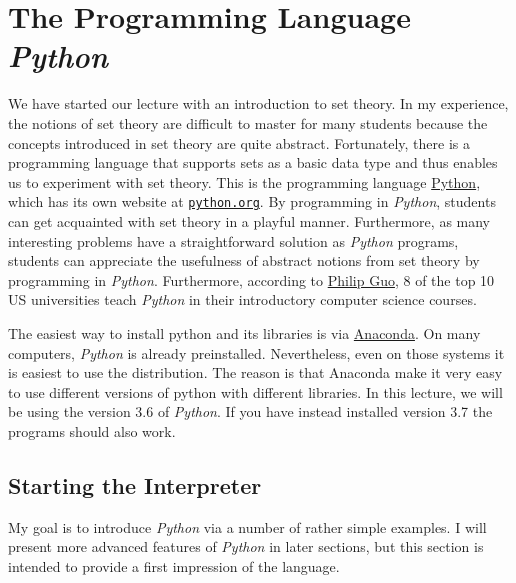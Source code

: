 \chapter{The Programming Language \textsl{Python}}
We have started our lecture with an introduction to set theory.  In my experience, the notions of
set theory are difficult to master for many students because the concepts introduced in set theory
are quite abstract.  Fortunately, there is a programming language that supports sets as a basic data type and
thus enables us to experiment with set theory.  This is the programming language
\href{https://en.wikipedia.org/wiki/Python_(programming_language)}{Python}, which has its own website at
\href{http://www.python.org}{\texttt{python.org}}. 
By programming in \textsl{Python}, students can get acquainted with set theory in a playful manner.
Furthermore, as many interesting problems have a straightforward solution as \textsl{Python} programs,
students can appreciate the usefulness of abstract notions from set theory by programming in \textsl{Python}.
Furthermore, according to 
\href{https://cacm.acm.org/blogs/blog-cacm/176450-python-is-now-the-most-popular-introductory-teaching-language-at-top-u-s-universities/fulltext}{Philip Guo},
8 of the top 10 US universities teach \textsl{Python} in their introductory computer science courses.

The easiest way to install python and its libraries is via \href{https://www.anaconda.com/download/}{Anaconda}.
On many computers, \textsl{Python} is already preinstalled.  Nevertheless, even on those systems it is easiest
to use the  distribution.  The reason is that Anaconda make it very easy to use different
versions of python with different libraries.  In this lecture, we will be using the version 3.6 of \textsl{Python}.
If you have instead installed version 3.7 the programs should also work.

\section{Starting the Interpreter}
My goal is to introduce \textsl{Python} via a number of rather simple examples.  I will present more
advanced features of \textsl{Python} in later sections, but this section is intended to provide a first
impression of the language.


